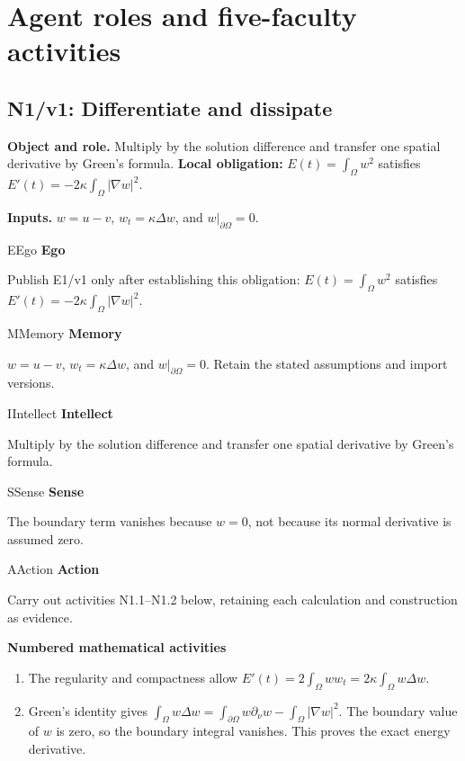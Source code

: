 \documentclass[preprint,12pt,aps,pra,showkeys,amsmath,amssymb,superscriptaddress,floatfix]{revtex4-2}
\theoremstyle{definition}
\theoremstyle{remark}
\newcommand{\mmfaculty}[3]{%
 \begin{mmfacultybox}{#1}{#2}
 {\sffamily\bfseries\color{MMBlue}#2}\par\smallskip #3
 \end{mmfacultybox}}
\newcommand{\field}[2]{\par\smallskip\noindent\textbf{#1.} #2\par}
\begin{document}
\endgroup

\clearpage\section{Agent roles and five-faculty activities}\begingroup\small\linespread{1.05}\selectfont{}

\subsection{N1/v1: Differentiate and dissipate}

\field{Object and role}{Multiply by the solution difference and transfer one spatial derivative
by Green's formula. \textbf{Local obligation:} \(E(t)=\int_\Omega w^2\)
satisfies \(E'(t)=-2\kappa\int_\Omega|\nabla w|^2\).}

\field{Inputs}{\(w=u-v\), \(w_t=\kappa\Delta w\), and \(w|_{\partial\Omega}=0\).}

\mmfaculty{E}{Ego}{Publish E1/v1 only after establishing this obligation:
\(E(t)=\int_\Omega w^2\) satisfies
\(E'(t)=-2\kappa\int_\Omega|\nabla w|^2\).}

\mmfaculty{M}{Memory}{\(w=u-v\), \(w_t=\kappa\Delta w\), and \(w|_{\partial\Omega}=0\). Retain
the stated assumptions and import versions.}

\mmfaculty{I}{Intellect}{Multiply by the solution difference and transfer one spatial derivative
by Green's formula.}

\mmfaculty{S}{Sense}{The boundary term vanishes because \(w=0\), not because its normal
derivative is assumed zero.}

\mmfaculty{A}{Action}{Carry out activities N1.1--N1.2 below, retaining each calculation and
construction as evidence.}

\smallskip\noindent\textbf{Numbered mathematical activities}

\begin{enumerate}[label=N1.\arabic*,leftmargin=3.4em]

\item The regularity and compactness allow
\(E'(t)=2\int_\Omega w w_t=2\kappa\int_\Omega w\Delta w\).

\item Green's identity gives
\(\int_\Omega w\Delta w=\int_{\partial\Omega}w\partial_\nu w-\int_\Omega|\nabla w|^2\).
The boundary value of \(w\) is zero, so the boundary integral vanishes.
This proves the exact energy derivative.

\end{enumerate}
\end{document}
